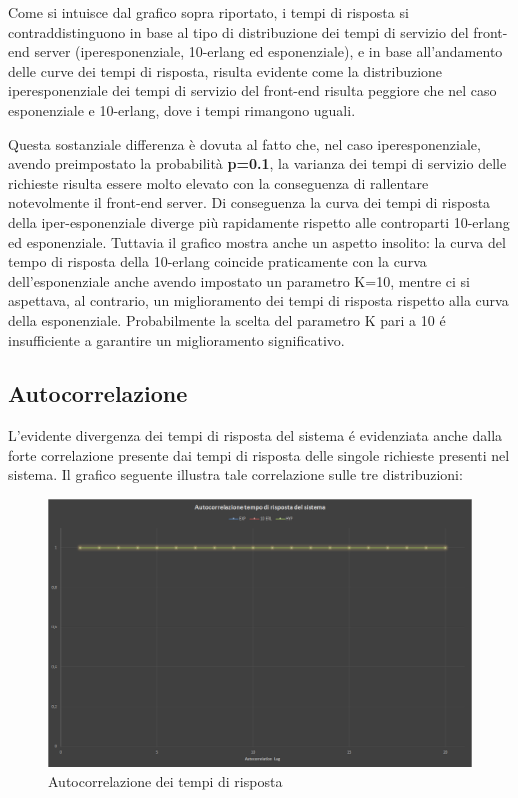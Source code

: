 Come si intuisce dal grafico sopra riportato, i tempi di risposta si contraddistinguono in base
al tipo di distribuzione dei tempi di servizio del front-end server (iperesponenziale, 10-erlang 
ed esponenziale), e in base all'andamento delle curve dei tempi di risposta, risulta evidente 
come la distribuzione iperesponenziale dei tempi di servizio del front-end risulta peggiore 
che nel caso esponenziale e 10-erlang, dove i tempi rimangono uguali.

Questa sostanziale differenza \`e dovuta al fatto che, nel caso iperesponenziale, avendo 
preimpostato la probabilità \textbf{p=0.1}, la varianza dei tempi di servizio delle richieste risulta 
essere molto elevato con la conseguenza di rallentare notevolmente il front-end server.
Di conseguenza la curva dei tempi di risposta della iper-esponenziale diverge pi\`u 
rapidamente rispetto alle controparti 10-erlang ed esponenziale. Tuttavia il grafico mostra 
anche un aspetto insolito: la curva del tempo di risposta della 10-erlang coincide 
praticamente con la curva dell'esponenziale anche avendo impostato un parametro K=10, 
mentre ci si aspettava, al contrario, un miglioramento dei tempi di risposta rispetto alla curva 
della esponenziale. Probabilmente la scelta del parametro K pari a 10 \'e insufficiente a 
garantire un miglioramento significativo.

\subsection{Autocorrelazione}

L'evidente divergenza dei tempi di risposta del sistema \'e evidenziata anche dalla forte 
correlazione presente dai tempi di risposta delle singole richieste presenti nel sistema. Il 
grafico seguente illustra tale correlazione sulle tre distribuzioni:

\begin{figure}[H]
 \centering
 \includegraphics[scale=0.45]{img/autocorrelation.png}
 \caption[Autocorrelazione dei tempi di risposta]{Autocorrelazione dei tempi di risposta}
 \label{fig:Autocorrelazione dei tempi di risposta}
\end{figure}

